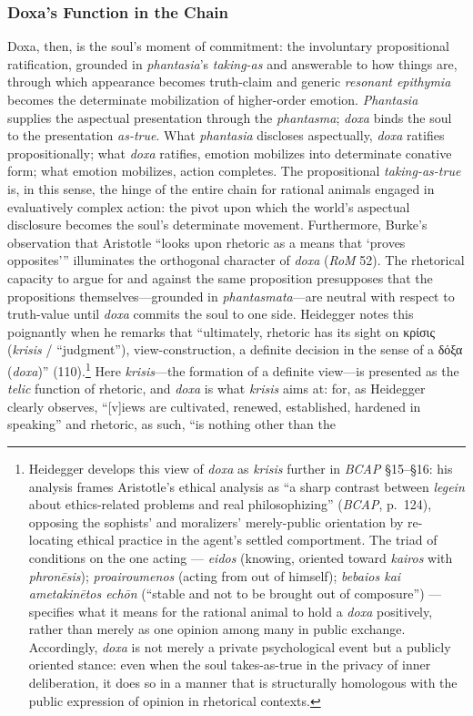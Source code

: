 \documentclass{article}
\newcommand{\gk}[1]{{\greekfont #1}}
\begin{document}
\subsubsection*{Doxa's Function in the Chain}

Doxa, then, is the soul's moment of commitment: the involuntary propositional ratification, grounded in \textit{phantasia}'s \textit{taking-as} and answerable to how things are, through which appearance becomes truth-claim and generic \textit{resonant epithymia} becomes the determinate mobilization of higher-order emotion. \textit{Phantasia} supplies the aspectual presentation through the \textit{phantasma}; \textit{doxa} binds the soul to the presentation \textit{as-true}. What \textit{phantasia} discloses aspectually, \textit{doxa} ratifies propositionally; what \textit{doxa} ratifies, emotion mobilizes into determinate conative form; what emotion mobilizes, action completes. The propositional \textit{taking-as-true} is, in this sense, the hinge of the entire chain for rational animals engaged in evaluatively complex action: the pivot upon which the world's aspectual disclosure becomes the soul's determinate movement. Furthermore, Burke's observation that Aristotle ``looks upon rhetoric as a means that `proves opposites''' illuminates the orthogonal character of \textit{doxa} (\textit{RoM} 52). The rhetorical capacity to argue for and against the same proposition presupposes that the propositions themselves---grounded in \textit{phantasmata}---are neutral with respect to truth-value until \textit{doxa} commits the soul to one side. Heidegger notes this poignantly when he remarks that ``ultimately, rhetoric has its sight on \gk{κρίσις} (\textit{krisis} / ``judgment''), view-construction, a definite decision in the sense of a \gk{δόξα} (\textit{doxa})'' (110).\footnote{Heidegger develops this view of \textit{doxa} as \textit{krisis} further in \textit{BCAP} §15--§16: his analysis frames Aristotle's ethical analysis as ``a sharp contrast between \textit{legein} about ethics-related problems and real philosophizing'' (\textit{BCAP}, p.~124), opposing the sophists' and moralizers' merely-public orientation by re-locating ethical practice in the agent's settled comportment. The triad of conditions on the one acting --- \textit{eidos} (knowing, oriented toward \textit{kairos} with \textit{phronēsis}); \textit{proairoumenos} (acting from out of himself); \textit{bebaios kai ametakinētos echōn} (``stable and not to be brought out of composure'') --- specifies what it means for the rational animal to hold a \textit{doxa} positively, rather than merely as one opinion among many in public exchange. Accordingly, \textit{doxa} is not merely a private psychological event but a publicly oriented stance: even when the soul takes-as-true in the privacy of inner deliberation, it does so in a manner that is structurally homologous with the public expression of opinion in rhetorical contexts.} Here \textit{krisis}---the formation of a definite view---is presented as the \textit{telic} function of rhetoric, and \textit{doxa} is what \textit{krisis} aims at: for, as Heidegger clearly observes, ``[v]iews are cultivated, renewed, established, hardened in speaking'' and rhetoric, as such, ``is nothing other than the 
\end{document}
